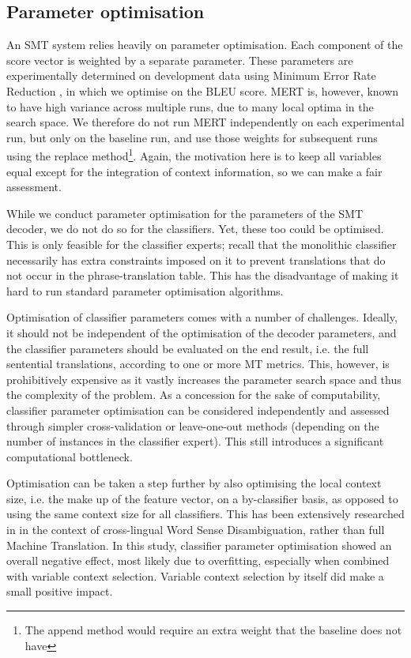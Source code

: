 \documentclass[smallextended]{svjour3}       %
\theoremstyle{break}
\begin{document}
\subsection{Parameter optimisation}
\label{sec:paropt}

An SMT system relies heavily on parameter optimisation. Each component of the
score vector is weighted by a separate parameter. These parameters are
experimentally determined on development data using Minimum Error Rate
Reduction \citep{MERT}, in which we optimise on the BLEU score. MERT is,
however, known to have high variance across multiple runs, due to many local
optima in the search space. We therefore do not run MERT independently on each
experimental run, but only on the baseline run, and use those weights for
subsequent runs using the replace method\footnote{The append method would
require an extra weight that the baseline does not have}. Again, the motivation
here is to keep all variables equal except for the integration of context
information, so we can make a fair assessment.

While we conduct parameter optimisation for the parameters of the SMT
decoder, we do not do so for the classifiers. Yet, these too could
be optimised. This is only feasible for the classifier experts; recall
that the monolithic classifier necessarily has extra constraints
imposed on it to prevent translations that do not occur in the
phrase-translation table. This has the disadvantage of making it hard
to run standard parameter optimisation algorithms.

Optimisation of classifier parameters comes with a number of challenges.
Ideally, it should not be independent of the optimisation of the decoder
parameters, and the classifier parameters should be evaluated on the
end result, i.e. the full sentential translations, according to one or more MT
metrics. This, however, is prohibitively expensive as it vastly increases the
parameter search space and thus the complexity of the problem. As a concession
for the sake of computability, classifier parameter optimisation can be considered
independently and assessed through simpler cross-validation or leave-one-out
methods (depending on the number of instances in the classifier expert).  This
still introduces a significant computational bottleneck.  

Optimisation can be taken a step further by also optimising the local context
size, i.e. the make up of the feature vector, on a by-classifier basis, as
opposed to using the same context size for all classifiers. This has been
extensively researched in \cite{UVTWSD2} in the context of cross-lingual Word
Sense Disambiguation, rather than full Machine Translation. In this study,
classifier parameter optimisation showed an overall negative effect, most
likely due to overfitting, especially when combined with variable context
selection. Variable context selection by itself did make a small positive
impact.
\end{document}
